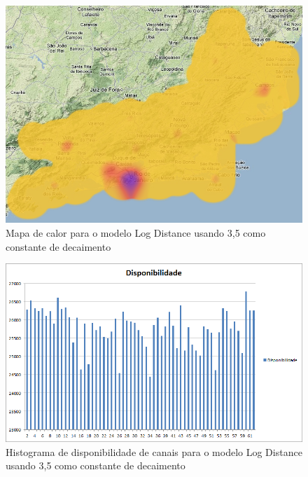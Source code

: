\begin{figure}[htb]
\centering
\includegraphics[width=1.0\textwidth]{figs/logdist35heatmap}
\caption[Mapa de calor para o modelo Log Distance usando 3,5 como constante de decaimento]
{Mapa de calor para o modelo Log Distance usando 3,5 como constante de decaimento }
\label{fig:LogDist35heatmap}
\end{figure} 

\begin{figure}[htb]
\centering
\includegraphics[width=1.0\textwidth]{figs/histogramalogdist35}
\caption[Histograma de disponibilidade de canais para o modelo Log Distance usando 3,5 como constante de decaimento]
{Histograma de disponibilidade de canais para o modelo Log Distance usando 3,5 como constante de decaimento}
\label{fig:histogramalogdist35}
\end{figure} 


\FloatBarrier

